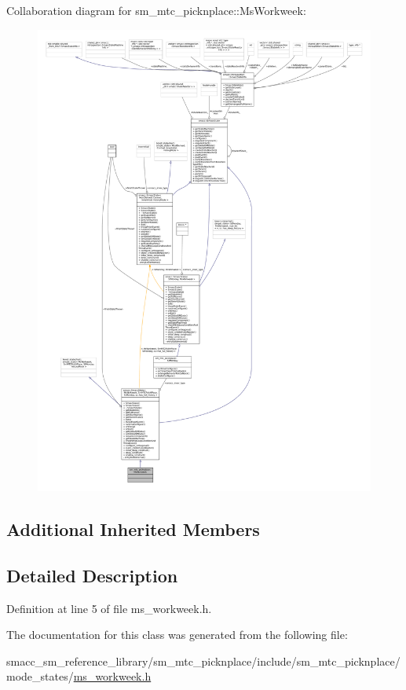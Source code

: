 Collaboration diagram for sm\+\_\+mtc\+\_\+picknplace\+:\+:Ms\+Workweek\+:
\nopagebreak
\begin{figure}[H]
\begin{center}
\leavevmode
\includegraphics[width=350pt]{classsm__mtc__picknplace_1_1MsWorkweek__coll__graph}
\end{center}
\end{figure}
\subsection*{Additional Inherited Members}


\subsection{Detailed Description}


Definition at line 5 of file ms\+\_\+workweek.\+h.



The documentation for this class was generated from the following file\+:\begin{DoxyCompactItemize}
\item 
smacc\+\_\+sm\+\_\+reference\+\_\+library/sm\+\_\+mtc\+\_\+picknplace/include/sm\+\_\+mtc\+\_\+picknplace/mode\+\_\+states/\hyperlink{sm__mtc__picknplace_2include_2sm__mtc__picknplace_2mode__states_2ms__workweek_8h}{ms\+\_\+workweek.\+h}\end{DoxyCompactItemize}
